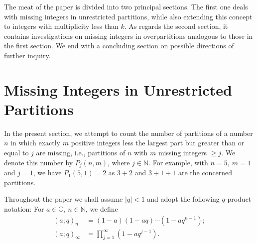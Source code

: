 \documentclass[12pt,reqno]{amsart}
\renewcommand{\(}{\left\(}
\renewcommand{\)}{\right\)}
\renewcommand{\[}{\left\[}
\renewcommand{\]}{\right\]}
\numberwithin{equation}{section}
\theoremstyle{plain}
\begin{document}
The meat of the paper is divided into two principal sections. The first one deals with missing integers in unrestricted partitions, while also extending this concept to integers with multiplicity less than $k$. As regards the second section, it contains investigations on missing integers in overpartitions analogous to those in the first section. We end with a concluding section on possible directions of further inquiry.

\section{Missing Integers in Unrestricted Partitions}
In the present section, we attempt to count the number of partitions of a number $n$ in which exactly $m$ positive integers less the largest part but greater than or equal to $j$ are missing, i.e., partitions of $n$ with $m$ missing integers $\geq j$. We denote this number by $P_j(n,m)$, where $j \in \mathbb{N}$. For example, with $n=5, \ m=1$ and $j=1$, we have $P_1(5,1)=2$ as $3+2$ and $3+1+1$ are the concerned partitions.   

Throughout the paper we shall assume $|q|<1$ and adopt the following $q$-product notation: For $a \in \mathbb{C}, \ n \in \mathbb{N}$, we define
\begin{align*}
(a;q)_n &=(1-a)(1-aq)\cdots(1-aq^{n-1}); \\
(a;q)_{\infty}&=\prod_{j=1}^{\infty} (1-aq^{j-1}).
\end{align*}
\end{document}
